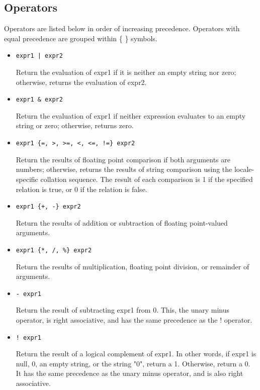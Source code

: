 \subsection{Operators}

Operators are listed below in order of increasing precedence.  Operators
with equal precedence are grouped within \{ \} symbols.

\begin{itemize}
  \item \verb!expr1 | expr2!

       Return the evaluation of expr1 if it is neither an empty string
       nor zero; otherwise, returns the evaluation of expr2.

  \item \verb!expr1 & expr2!

       Return the evaluation of expr1 if neither expression evaluates to
       an empty string or zero; otherwise, returns zero.

  \item \verb+expr1 {=, >, >=, <, <=, !=} expr2+

       Return the results of floating point comparison if both arguments are
       numbers; otherwise, returns the results of string comparison
       using the locale-specific collation sequence.  The result of each
       comparison is 1 if the specified relation is true, or 0 if the
       relation is false.

  \item \verb!expr1 {+, -} expr2!

       Return the results of addition or subtraction of floating point-valued
       arguments.

  \item \verb!expr1 {*, /, %} expr2!

       Return the results of multiplication, floating point division, or
       remainder of arguments.

  \item \verb!- expr1!

       Return the result of subtracting expr1 from 0.
       This, the unary minus operator, is right associative, and
       has the same precedence as the ! operator.

  \item \verb+! expr1+

       Return the result of a logical complement of expr1.
       In other words, if expr1 is null, 0, an empty string,
       or the string "0", return a 1. Otherwise, return a 0.
       It has the same precedence as the unary minus operator, and
       is also right associative.


\end{itemize}
